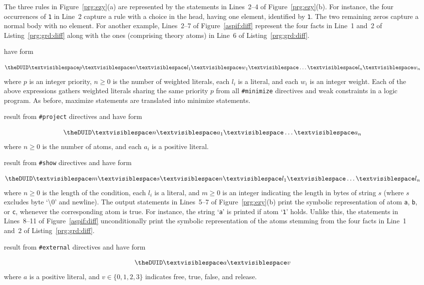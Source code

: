 The three rules in Figure~\ref{prg:ezy}(a) are represented by the statements in Lines~2--4 of Figure~\ref{prg:ezy}(b).
For instance, the four occurrences of \lstinline{1} in Line~2 capture a rule with a choice in the head, having one element, identified by \lstinline{1}.
The two remaining zeros capture a normal body with no element.
For another example,
Lines~2--7 of Figure~\ref{aspif:diff} represent the four facts in Line~1 and~2 of Listing~\ref{prg:grd:diff}
along with the ones (comprising theory atoms) in Line~6 of Listing~\ref{prg:grd:diff}.

 have form
\addtocounter{DUID}{1}
\[\texttt{\theDUID} \Space p \Space n \Space l_1 \Space w_1 \Space \dots \Space l_n \Space w_n\]
where
$p$ is an integer priority,
$n \geq 0$ is the number of weighted literals,
each $l_i$ is a literal, and
each $w_i$ is an integer weight.
%
Each of the above expressions gathers weighted literals sharing the same priority $p$
from all \lstinline{#minimize} directives and weak constraints in a logic program.
As before, maximize statements are translated into minimize statements.

 result from \lstinline{#project} directives and have form
\addtocounter{DUID}{1}
\[\texttt{\theDUID} \Space n  \Space a_1 \Space \dots \Space a_n\]
where
$n \geq 0$ is the number of atoms, and
each $a_i$ is a positive literal.

 result from \lstinline{#show} directives and have form
\addtocounter{DUID}{1}
\[\texttt{\theDUID} \Space m \Space s \Space n  \Space l_1 \Space \dots \Space l_n\]
where
$n \geq 0$ is the length of the condition,
each $l_i$ is a literal, and
$m\geq0$ is an integer indicating the length in bytes of string $s$
(where $s$ excludes byte `\textbackslash0' and newline).
%
The output statements in Lines~5--7 of Figure~\ref{prg:ezy}(b) print the symbolic representation of atom
\lstinline{a}, \lstinline{b}, or \lstinline{c}, whenever the corresponding atom is true. %
For instance, the string `\lstinline{a}' is printed  if atom `\lstinline{1}' holds.
Unlike this,
the statements in Lines~8--11 of Figure~\ref{aspif:diff} unconditionally print the symbolic representation
of the atoms stemming from the four     facts in Line~1 and~2 of Listing~\ref{prg:grd:diff}.

 result from \lstinline{#external} directives and have form
\addtocounter{DUID}{1}
\[\texttt{\theDUID} \Space a \Space v\]
where
$a$ is a positive literal, and
$v \in \{0,1,2,3\}$ indicates free, true, false, and release.

